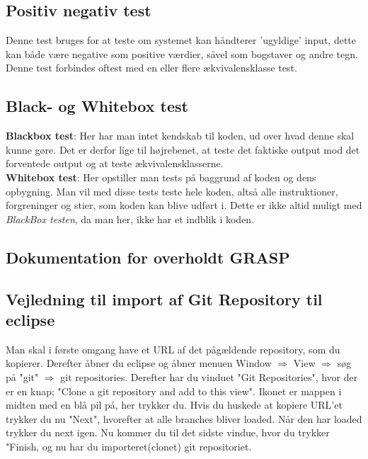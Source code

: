     \subsection{Positiv negativ test}
        Denne test bruges for at teste om systemet kan håndterer 'ugyldige' input, dette kan både være negative som positive værdier, såvel som bogstaver og andre tegn. Denne test forbindes oftest med en eller flere ækvivalensklasse test.
    \subsection{Black- og Whitebox test}
        \textbf{Blackbox test}: Her har man intet kendskab til koden, ud over hvad denne skal kunne gøre. Det er derfor lige til højrebenet, at teste det faktiske output mod det forventede output og at teste ækvivalensklasserne.
        \\
        \textbf{Whitebox test}: Her opstiller man tests på baggrund af koden og dens opbygning. Man vil med disse tests teste hele koden, altså alle instruktioner, forgreninger og stier, som koden kan blive udført i. Dette er ikke altid muligt med \textit{BlackBox testen}, da man her, ikke har et indblik i koden.

\subsection{Dokumentation for overholdt GRASP}

\subsection{Vejledning til import af Git Repository til eclipse}
Man skal i første omgang have et URL af det pågældende repository, som du kopierer.
Derefter åbner du eclipse og åbner menuen 
Window $\Rightarrow$ View $\Rightarrow$ søg på "git" $\Rightarrow$ git repositories.
Derefter har du vinduet "Git Repositories", hvor der er en knap; "Clone a git repository and add to this view".
Ikonet er mappen i midten med en blå pil på, her trykker du.
Hvis du huskede at kopiere URL'et trykker du nu "Next", hvorefter at alle branches bliver loaded. Når den har loaded trykker du next igen.
Nu kommer du til det sidste vindue, hvor du trykker "Finish, og nu har du importeret(clonet) git repositoriet.
